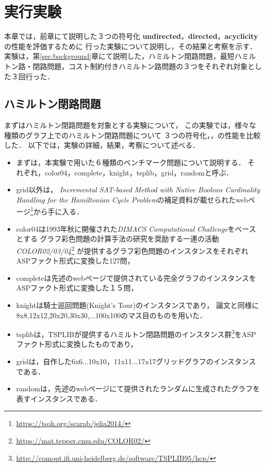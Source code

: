 \chapter{実行実験}
本章では，前章にて説明した３つの符号化
\textbf{undirected}，\textbf{directed}，\textbf{acyclicity}
の性能を評価するために
行った実験について説明し，その結果と考察を示す．
実験は，第\ref{sec:background}章にて説明した，ハミルトン閉路問題，最短ハミルトン路・閉路問題，コスト制約付きハミルトン路問題の３つをそれぞれ対象とした３回行った．
\section{ハミルトン閉路問題}
まずはハミルトン閉路問題を対象とする実験について，
この実験では，様々な種類のグラフ上でのハミルトン閉路問題について
３つの符号化，，の性能を比較した．
以下では，実験の詳細，結果，考察について述べる．

\begin{itemize}
\item まずは，本実験で用いた６種類のベンチマーク問題について説明する．
それぞれ，color04，complete，knight，tsplib，grid，randomと呼ぶ．
\item grid以外は，
\textit{Incremental SAT-based Method with Native Boolean Cardinality Handling for the Hamiltonian Cycle Problem}\cite{soh14}の補足資料が載せられたwebページ\footnote{\url{https://tsoh.org/scarab/jelia2014/}}から手に入る．

\item color04は1993年秋に開催された\textit{DIMACS Computational Challenge}をベースとする
グラフ彩色問題の計算手法の研究を奨励する一連の活動
\textit{COLOR02/03/04}\footnote{\url{https://mat.tepper.cmu.edu/COLOR02/}}
が提供するグラフ彩色問題のインスタンスをそれぞれASPファクト形式に変換した127問，
\item completeは先述のwebページ\footnotemark[1]で提供されている完全グラフのインスタンスをASPファクト形式に変換した１５問，
\item knightは騎士巡回問題(Knight's Tour)のインスタンスであり，
論文\cite{soh14}と同様に8x8,12x12,20x20,30x30,...100x100のマス目のものを用いた．
\item tsplibは，TSPLIBが提供するハミルトン閉路問題のインスタンス群\footnote{\url{http://comopt.ifi.uni-heidelberg.de/software/TSPLIB95/hcp/}}をASPファクト形式に変換したものであり，
\item gridは，自作した6x6...10x10，11x11...17x17グリッドグラフのインスタンスである．
\item randomは，先述のwebページ\footnotemark[1]にて提供されたランダムに生成されたグラフを表すインスタンスである．
\end{itemize}

